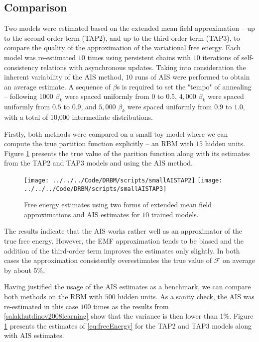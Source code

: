\subsection{Comparison}
Two models were estimated based on the extended mean field approximation -- up to the second-order term (TAP2), and up to the third-order term (TAP3), to compare the quality of the approximation of the variational free energy.
Each model was re-estimated $10$ times using persistent chains with $10$ iterations of self-consistency relations with asynchronous updates. Taking into consideration the inherent variability of the AIS method, $10$ runs of AIS were performed to obtain an average estimate.  A sequence of $\beta$s is required to set the "tempo" of annealing -- following \cite{salakhutdinov2008learning} $1000$ $\beta_k$ were spaced uniformly from  $0 $ to  $0.5$, $4,000$ $\beta_k$ were spaced uniformly from $0.5$ to $0.9$, and $5,000$ $\beta_k$ were spaced uniformly from $0.9$ to $1.0$, with a total of 10,000 intermediate distributions. 

Firstly, both methods were compared on a small toy model where we can compute the true partition function explicitly -- an RBM with $15$ hidden units. Figure \ref{fig:AISTAP2small} presents the true value of the parition function along with its estimates from the TAP2 and TAP3 models and using the AIS method.

\begin{figure}[!htb]
%
 \texttt{[image: ../../../Code/DRBM/scripts/smallAISTAP2]}
\endminipage 
{}  
\texttt{[image: ../../../Code/DRBM/scripts/smallAISTAP3]}
\endminipage\hfill
  \caption[1]{Free energy estimates using two forms of extended mean field approximations and AIS estimates for $10$ trained models.}
  \label{fig:AISTAP2small}
\end{figure}

The results indicate that the AIS works rather well as an approximator of the true free energy. However, the EMF approximation tends to be biased and the addition of the third-order term improves the estimates only slightly. In both cases the approximation consistently overestimates the true value of $\mathcal{F}$ on average by about $5\%$. 

Having justified the usage of the AIS estimates as a benchmark, we can compare both methods on the RBM with $500$ hidden units. As a sanity check, the AIS was re-estimated in this case $100$ times as the results from \ref{salakhutdinov2008learning} show that the variance is then lower than $1\%$. Figure \ref{fig:AISTAP2small} presents the estimates of \ref{eq:freeEnergy} for the TAP2 and TAP3 models along with AIS estimates.

